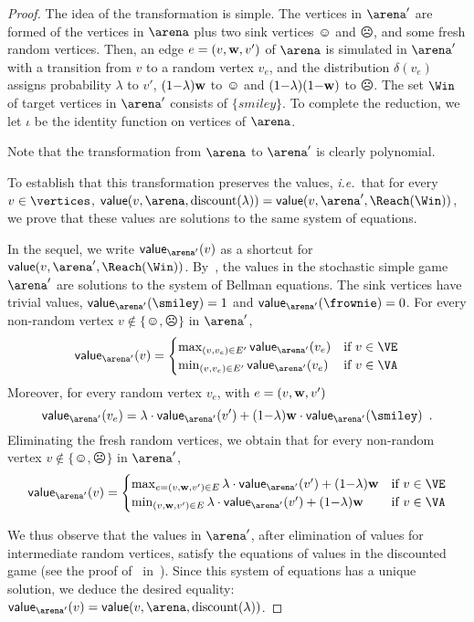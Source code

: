 \begin{proof}
The idea of the transformation is simple. The vertices in $\arena'$
are formed of the vertices in $\arena$ plus two sink vertices
$\smiley$ and $\frownie$, and some fresh random vertices. Then, an
edge $e = (v,\mathbf{w},v')$ of $\arena$ is simulated in $\arena'$ with
a transition from $v$ to a random vertex $v_e$, and the distribution
$\delta(v_e)$ assigns probability $\lambda$ to $v'$,
$(1{-}\lambda)\mathbf{w}$ to $\smiley$ and $(1{-}\lambda)(1{-}\mathbf{w})$
to $\frownie$. The set $\Win$ of target vertices in $\arena'$
consists of $\{smiley\}$. To complete the reduction, we let $\iota$
be the identity function on vertices of $\arena$.

Note that the transformation from $\arena$ to $\arena'$ is clearly
polynomial.


To establish that this transformation preserves the values,
\emph{i.e.}\ that for every $v \in \vertices$,
$\mathsf{value}(v,\arena,\textrm{discount}(\lambda)) =
\mathsf{value}(v,\arena',\Reach(\Win))$, we prove that these
values are solutions to the same system of equations.

In the sequel, we write $\mathsf{value}_{\arena'}(v)$ as a shortcut
for $\mathsf{value}(v,\arena',\Reach(\Win))$.
By~, the values in the stochastic simple game
$\arena'$ are solutions to the system of Bellman equations. The sink
vertices have trivial values, $\mathsf{value}_{\arena'}(\smiley) =1$
and $\mathsf{value}_{\arena'}(\frownie) =0$.  For every non-random
vertex $v \notin \{\smiley,\frownie\}$ in $\arena'$,
\[
\mathsf{value}_{\arena'}(v)
= \begin{cases}   \max_{(v,v_e) \in E'}  \mathsf{value}_{\arena'}(v_e) & \text{if}\ v \in \VE \\
 \min_{(v,v_e) \in E'}  \mathsf{value}_{\arena'}(v_e)  & \text{if}\ v \in \VA
 \end{cases}
 \]
 Moreover, for every random vertex $v_e$, with $e=(v,\mathbf{w},v')$
 \[
 \mathsf{value}_{\arena'}(v_e) = \lambda \cdot
 \mathsf{value}_{\arena'}(v') + (1{-}\lambda) \weight \cdot
 \mathsf{value}_{\arena'}(\smiley) \enspace.
\]
 Eliminating the fresh
random vertices, we obtain that for every non-random vertex
$v \notin \{\smiley,\frownie\}$ in $\arena'$,
\[
\mathsf{value}_{\arena'}(v) =
\begin{cases}
  \max_{e=(v,\weight,v') \in E}  \lambda \cdot
 \mathsf{value}_{\arena'}(v') + (1{-}\lambda) \weight & \text{if}\ v \in \VE\\
  \min_{(v,\weight,v') \in E}  \lambda \cdot
 \mathsf{value}_{\arena'}(v') + (1{-}\lambda) \weight & \text{if}\ v \in \VA
 \end{cases}
\]

We thus observe that the values in $\arena'$, after elimination of
values for intermediate random vertices, satisfy the equations of
values in the discounted game (see the proof
of~ in~). Since
this system of equations has a unique solution, we deduce the
desired equality:
$\mathsf{value}_{\arena'}(v) =
\mathsf{value}(v,\arena,\textrm{discount}(\lambda))$.
\end{proof}

